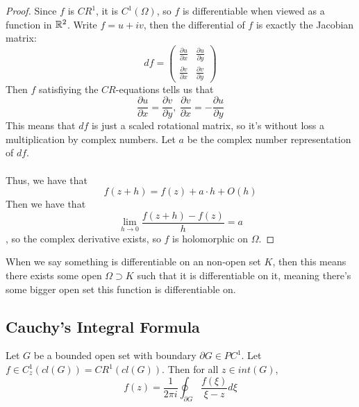 \begin{proof}
Since $f$ is $CR^1$, it is $C^1(\Omega)$, so $f$ is differentiable when viewed as a function in $\mathbb{R}^2$. Write $f = u + iv$, then the differential of $f$ is exactly the Jacobian matrix:
\[df = \begin{pmatrix} \frac{\partial u}{\partial x} & \frac{\partial u}{\partial y}\\
\frac{\partial v}{\partial x} & \frac{\partial v}{\partial y} \end{pmatrix}\]
Then $f$ satisfiying the $CR$-equations tells us that
\[\frac{\partial u}{\partial x} = \frac{\partial v}{\partial y},\ \frac{\partial v}{\partial x} = -\frac{\partial u}{\partial y}\]
This means that $df$ is just a scaled rotational matrix, so it's without loss a multiplication by complex numbers. Let $a$ be the complex number representation of $df$.\\\\
Thus, we have that
\[f(z + h) = f(z) + a \cdot h + O(h)\]
Then we have that
\[\lim_{h \to 0} \frac{f(z + h) - f(z)}{h} = a\]
, so the complex derivative exists, so $f$ is holomorphic on $\Omega$.
\end{proof}

When we say something is differentiable on an non-open set $K$, then this means there exists some open $\Omega \supset K$ such that it is differentiable on it, meaning there's some bigger open set this function is differentiable on.

\subsection{Cauchy's Integral Formula}

\begin{theorem}
Let $G$ be a bounded open set with boundary $\partial G \in PC^1$. Let $f \in C^1_z(cl(G)) = CR^1(cl(G))$. Then for all $z \in int(G)$,
\[f(z) = \frac{1}{2 \pi i} \oint_{\partial G} \frac{f(\xi)}{\xi - z} d\xi\]
\end{theorem}

